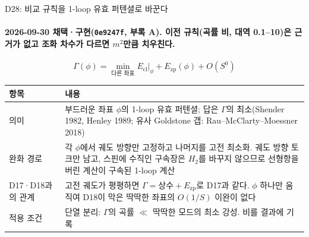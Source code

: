 \begin{frame}[label=d28-principle]{D28: 비교 규칙을 1-loop 유효 퍼텐셜로 바꾼다}
  \framesubtitle{2026-09-30 채택·구현(\texttt{0e9247f}, 부록 A). 이전 규칙(곡률 비, 대역 0.1--10)은 근거가 없고 조화 차수가 다르면 $m^2$만큼 치우친다.}
  \small
  \[
    \Gamma(\phi)=\min_{\text{다른 좌표}}E_{\mathrm{cl}}\big|_{\phi}+E_{\mathrm{zp}}(\phi)+O(S^0)
  \]
  \begin{tabularx}{\textwidth}{@{}P{2.6cm}Y@{}}
    \toprule
    항목 & 내용 \\
    \midrule
    의미 & 부드러운 좌표 $\phi$의 1-loop 유효 퍼텐셜; 답은 $\Gamma$의 최소(Shender 1982, Henley 1989; 유사 Goldstone 갭: Rau--McClarty--Moessner 2018) \\
    완화 경로 & 각 $\phi$에서 궤도 방향만 고정하고 나머지를 고전 최소화. 궤도 방향 토크만 남고, 스핀에 수직인 구속장은 $H_2$를 바꾸지 않으므로 선형항을 버린 계산이 구속된 1-loop 계산 \\
    D17·D18과의 관계 & 고전 궤도가 평평하면 $\Gamma=\text{상수}+E_{\mathrm{zp}}$로 D17과 같다. $\phi$ 하나만 움직여 D18이 막은 딱딱한 좌표의 $O(1/S)$ 이완이 없다 \\
    적용 조건 & 단열 분리: $\Gamma$의 곡률 $\ll$ 딱딱한 모드의 최소 강성. 비를 결과에 기록 \\
    \bottomrule
  \end{tabularx}
  \par\medskip
\end{frame}

